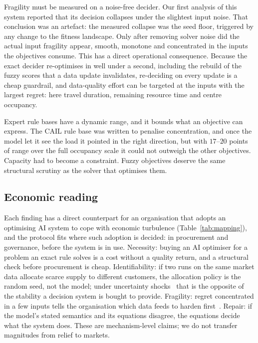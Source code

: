 \documentclass[systems,article,submit,moreauthors,pdftex]{Definitions/mdpi}
\begin{document}
Fragility must be measured on a noise-free decider. Our first analysis of this system
reported that its decision collapses under the slightest input noise. That conclusion was an
artefact: the measured collapse was the seed floor, triggered by any change to the fitness
landscape. Only after removing solver noise did the actual input fragility appear, smooth,
monotone and concentrated in the inputs the objectives consume. This has a direct operational
consequence. Because the exact decider re-optimises in well under a second, including the rebuild of the
fuzzy scores that a data update invalidates, re-deciding on every update is a cheap guardrail, and data-quality effort can be targeted at the inputs with the
largest regret: here travel duration, remaining resource time and centre occupancy.

Expert rule bases have a dynamic range, and it bounds what an objective can express. The
CAIL rule base was written to penalise concentration, and once the model let it see the load
it pointed in the right direction, but with $17$--$20$ points of range over the full
occupancy scale it could not outweigh the other objectives. Capacity had to become a
constraint. Fuzzy objectives deserve the same structural scrutiny as the solver that
optimises them.

\subsection{Economic reading}
Each finding has a direct counterpart for an organisation that adopts an optimising AI system
to cope with economic turbulence (Table~\ref{tab:mapping}), and the protocol fits where such
adoption is decided: in procurement and governance, before the system is in use. Necessity: buying an AI optimiser
for a problem an exact rule solves is a cost without a quality return, and a structural check
before procurement is cheap. Identifiability: if two runs on the same market data allocate
scarce supply to different customers, the allocation policy is the random seed, not the
model; under uncertainty shocks~\cite{bloom2009uncertainty} that is the opposite of the
stability a decision system is bought to provide. Fragility: regret concentrated in a few
inputs tells the organisation which data feeds to harden first~\cite{wang1996dataquality,sambasivan2021cascades}.
Repair: if the model's stated semantics and its equations disagree, the equations decide what
the system does. These are mechanism-level claims; we do not transfer magnitudes from relief
to markets.
\end{document}
